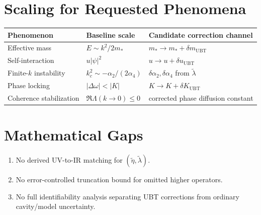 \documentclass[11pt,a4paper]{article}
\begin{document}
\section{Scaling for Requested Phenomena}
\begin{center}
\begin{tabular}{@{}lll@{}}
\toprule
Phenomenon & Baseline scale & Candidate correction channel \\
\midrule
Effective mass & $E\sim k^2/2m_*$ & $m_*\to m_*+\delta m_{\mathrm{UBT}}$ \\
Self-interaction & $u|\psi|^2$ & $u\to u+\delta u_{\mathrm{UBT}}$ \\
Finite-$k$ instability & $k_c^2\sim -\alpha_2/(2\alpha_4)$ & $\delta\alpha_2,\delta\alpha_4$ from $\tilde\lambda$ \\
Phase locking & $|\Delta\omega|<|K|$ & $K\to K+\delta K_{\mathrm{UBT}}$ \\
Coherence stabilization & $\Re\Lambda(k\to0)\le0$ & corrected phase diffusion constant \\
\bottomrule
\end{tabular}
\end{center}

\section{Mathematical Gaps}
\begin{enumerate}
\item No derived UV-to-IR matching for $(\tilde\eta,\tilde\lambda)$.
\item No error-controlled truncation bound for omitted higher operators.
\item No full identifiability analysis separating UBT corrections from ordinary cavity/model uncertainty.
\end{enumerate}
\end{document}

